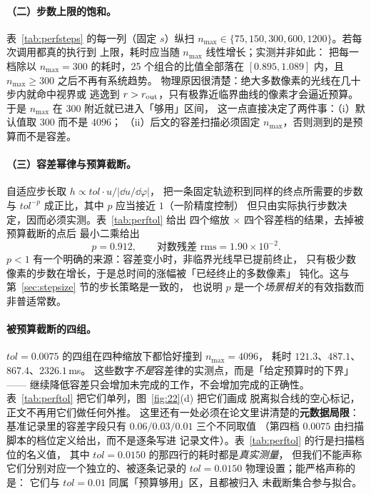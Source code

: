 \paragraph{（二）步数上限的饱和。}
表~\ref{tab:perfsteps} 的每一列（固定 $s$）纵扫
$n_{\max}\in\{75,150,300,600,1200\}$。若每次调用都真的执行到
上限，耗时应当随 $n_{\max}$ 线性增长；实测并非如此：
把每一档除以 $n_{\max}=300$ 的耗时，25 个组合的比值全部落在
$[0.895,1.089]$ 内，且 $n_{\max}\geq300$ 之后不再有系统趋势。
物理原因很清楚：绝大多数像素的光线在几十步内就命中视界或
逃逸到 $r>r_{\rm out}$，只有极靠近临界曲线的像素才会逼近预算。
于是 $n_{\max}$ 在 $300$ 附近就已进入「够用」区间，
这一点直接决定了两件事：（i）默认值取 $300$ 而不是 $4096$；
（ii）后文的容差扫描必须固定 $n_{\max}$，否则测到的是预算而不是容差。



\paragraph{（三）容差幂律与预算截断。}
自适应步长取 $h\propto tol\cdot u/|\dd u/\dd\varphi|$，
把一条固定轨迹积到同样的终点所需要的步数与
$tol^{-p}$ 成正比，其中 $p$ 应当接近 $1$（一阶精度控制）
但只由实际执行步数决定，因而必须实测。表~\ref{tab:perftol} 给出
四个缩放 $\times$ 四个容差档的结果，去掉被预算截断的点后
最小二乘给出
\begin{equation}\label{eq:costtol}
  p = 0.912,\qquad \text{对数残差 rms} = 1.90\times10^{-2}.
\end{equation}
$p<1$ 有一个明确的来源：容差变小时，非临界光线早已提前终止，
只有极少数像素的步数在增长，于是总时间的涨幅被「已经终止的多数像素」
钝化。这与第~\ref{sec:stepsize} 节的步长策略是一致的，
也说明 $p$ 是一个\emph{场景相关}的有效指数而非普适常数。

\paragraph{被预算截断的四组。}
$tol=0.0075$ 的四组在四种缩放下都恰好撞到 $n_{\max}=4096$，
耗时 $121.3$、$487.1$、$867.4$、$2326.1$\,ms。
这些数字\emph{不是}容差律的实测点，而是「给定预算时的下界」——
继续降低容差只会增加未完成的工作，不会增加完成的正确性。
表~\ref{tab:perftol} 把它们单列，图~\ref{fig:22}(d) 把它们画成
脱离拟合线的空心标记，正文不再用它们做任何外推。
这里还有一处必须在论文里讲清楚的\textbf{元数据局限}：
基准记录里的容差字段只有 $0.06/0.03/0.01$ 三个不同取值
（第四档 $0.0075$ 由扫描脚本的档位定义给出，而不是逐条写进
记录文件）。表~\ref{tab:perftol} 的行是扫描档位的名义值，
其中 $tol=0.0150$ 的那四行的耗时都是\emph{真实测量}，
但我们不能声称它们分别对应一个独立的、被逐条记录的
$tol=0.0150$ 物理设置；能严格声称的是：
它们与 $tol=0.01$ 同属「预算够用」区，且都被归入
未截断集合参与拟合。

